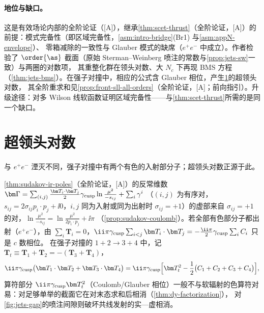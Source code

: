 \paragraph{地位与缺口。}
这是有效场论内部的全阶论证（[A]），继承\cref{thm:scet-thrust}（全阶论证，[A]）的前提：模式完备性（即区域完备性，\cref{asm:intro-bridge}(Br1) 与\cref{asm:appN-envelope}）、
零箱减除的一致性与 Glauber 模式的缺席（$e^+e^-$ 中成立）。作者检验了 $\order{\as}$ 截面（原始 Sterman--Weinberg 喷注的常数与\cref{prop:jets-sw}一致）与两圈的对数项，
其重整化群在领头对数、大 $N_c$ 下再现 BMS 方程（\cref{thm:jets-bms}）。在强子对撞中，相应的公式含 Glauber 相位，产生\cref{sec:jets-sll}的超领头对数，
其全阶重求和见\cref{prop:front-sll-all-orders}（全阶论证，[A]；前向指引）。升级途径：对多 Wilson 线软函数证明区域完备性——与\cref{thm:scet-thrust}所需的是同一个缺口。
\section{超领头对数}\label{sec:jets-sll}

与 $e^+e^-$ 湮灭不同，强子对撞中有两个有色的入射部分子；超领头对数正源于此。

\cref{thm:sudakov-ir-poles}（全阶论证，[A]）的反常维数 $\bm\Gamma=\sum_{(i,j)}\frac{\bm T_i\cdot\bm T_j}{2}\gamma_{\rm cusp}\ln\frac{\mu^2}{-s_{ij}}+\sum_i\gamma^i$
（$(i,j)$ 为有序对，$s_{ij}=2\sigma_{ij}p_i\cdot p_j+\ii0$，$i,j$ 同为入射或同为出射时 $\sigma_{ij}=+1$）的虚部来自 $\sigma_{ij}=+1$ 的对，$\ln\frac{\mu^2}{-s_{ij}}=\ln\frac{\mu^2}{2p_i\cdot p_j}+\ii\pi$
（\cref{prop:sudakov-coulomb}）。若全部有色部分子都出射（$e^+e^-$），由 $\sum_i\bm T_i=0$，$\ii\pi\gamma_{\rm cusp}\sum_{i<j}\bm T_i\cdot\bm T_j=-\frac{\ii\pi}{2}\gamma_{\rm cusp}\sum_iC_i$ 只是 $c$ 数相位。
在强子对撞的 $1+2\to3+4$ 中，记 $\bm T_t\equiv\bm T_1+\bm T_2=-(\bm T_3+\bm T_4)$，
\begin{equation}\label{eq:jets-coulomb-pp}
\ii\pi\gamma_{\rm cusp}\big(\bm T_1\cdot\bm T_2+\bm T_3\cdot\bm T_4\big)=\ii\pi\gamma_{\rm cusp}\Big[\bm T_t^2-\frac12\big(C_1+C_2+C_3+C_4\big)\Big],
\end{equation}
算符部分 $\ii\pi\gamma_{\rm cusp}\bm T_t^2$（Coulomb/Glauber 相位）一般不与软辐射的色算符对易：对足够单举的截面它在对末态求和后相消（\cref{thm:dy-factorization}），
对\cref{fig:jets-gap}的喷注间隙则破坏共线发射的实—虚相消。

